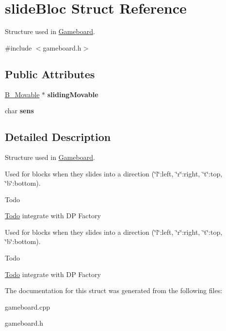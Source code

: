 \hypertarget{structslide_bloc}{}\section{slide\+Bloc Struct Reference}
\label{structslide_bloc}


Structure used in \hyperlink{class_gameboard}{Gameboard}.  




{\ttfamily \#include $<$gameboard.\+h$>$}

\subsection*{Public Attributes}
\begin{DoxyCompactItemize}
\item 
\hypertarget{structslide_bloc_a507f5abaf1435d1160c7000a5544547d}{}\hyperlink{class_b___movable}{B\+\_\+\+Movable} $\ast$ {\bfseries sliding\+Movable}\label{structslide_bloc_a507f5abaf1435d1160c7000a5544547d}

\item 
\hypertarget{structslide_bloc_adddf09c54543b518c768c0499f2db8b3}{}char {\bfseries sens}\label{structslide_bloc_adddf09c54543b518c768c0499f2db8b3}

\end{DoxyCompactItemize}


\subsection{Detailed Description}
Structure used in \hyperlink{class_gameboard}{Gameboard}. 

Used for blocks when they slides into a direction (\char`\"{}l\char`\"{}\+:left, \char`\"{}r\char`\"{}\+:right, \char`\"{}t\char`\"{}\+:top, \char`\"{}b\char`\"{}\+:bottom). \begin{DoxyRefDesc}{Todo}
\item[\hyperlink{todo__todo000009}{Todo}]integrate with D\+P Factory \end{DoxyRefDesc}


Used for blocks when they slides into a direction (\char`\"{}l\char`\"{}\+:left, \char`\"{}r\char`\"{}\+:right, \char`\"{}t\char`\"{}\+:top, \char`\"{}b\char`\"{}\+:bottom). \begin{DoxyRefDesc}{Todo}
\item[\hyperlink{todo__todo000021}{Todo}]integrate with D\+P Factory \end{DoxyRefDesc}


The documentation for this struct was generated from the following files\+:\begin{DoxyCompactItemize}
\item 
gameboard.\+cpp\item 
gameboard.\+h\end{DoxyCompactItemize}
